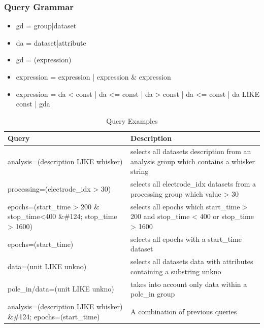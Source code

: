 \documentclass[utf8]{frontiersSCNS} %
\begin{document}
\subsubsection{Query Grammar}
\label{Query_Grammar}

\begin{itemize}  
\item gd = group|dataset
\item da = dataset|attribute
\item gd = (expression)
\item expression = expression | expression \& expression
\item expression = da < const | da <= const | da > const | da <= const | da LIKE const | gda
\end{itemize}

\begin{table}
\caption{Query Examples}
\label{tab:query-examples}       %

\begin{tabular}{ |p{7cm}|p{9cm}| }
\hline
	 \textbf{Query}                                  &       \textbf{Description} \\ \hline
	
	 analysis=(description LIKE whisker)  &  selects all datasets description from an analysis group which contains a whisker string  \\ \hline
	 processing=(electrode\_idx > 30)        &  selects all electrode\_idx datasets from a processing group which value > 30   \\ \hline
	 epochs=(start\_time > 200 \& stop\_time<400 \&\#124; stop\_time > 1600)  &  selects all epochs which start\_time > 200 and stop\_time < 400 or stop\_time > 1600 \\ \hline
	 epochs=(start\_time)                     &  selects all epochs with a start\_time dataset         \\ \hline
	 data=(unit LIKE unkno)  &  selects all datasets data with attributes containing a substring unkno \\ \hline
	 pole\_in/data=(unit LIKE unkno)  &  takes into account only data within a pole\_in group \\ \hline
	 analysis=(description LIKE whisker) \&\#124; epochs=(start\_time)   &  A combination of previous queries \\ \hline

\end{tabular}

\end{table}
\end{document}
